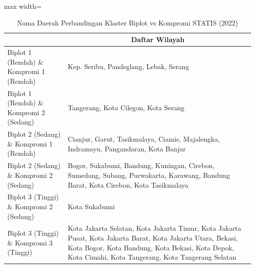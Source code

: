 \begin{table}[H]
\centering
\caption{Nama Daerah Perbandingan Klaster Biplot vs Kompromi STATIS (2022)} \label{tab:app1biplot_comp_name_2022}
\begin{adjustbox}{max width=\textwidth}
\begin{tabular}{|>{\centering\arraybackslash}p{4cm}|p{10cm}|}
\hline
\multicolumn{1}{|c|}{\textbf{Kategori}} & \multicolumn{1}{c|}{\textbf{Daftar Wilayah}} \\
\hline
Biplot 1 (Rendah) \& Kompromi 1 (Rendah) & Kep. Seribu, Pandeglang, Lebak, Serang \\
\hline
Biplot 1 (Rendah) \& Kompromi 2 (Sedang) & Tangerang, Kota Cilegon, Kota Serang \\
\hline
Biplot 2 (Sedang) \& Kompromi 1 (Rendah) & Cianjur, Garut, Tasikmalaya, Ciamis, Majalengka, Indramayu, Pangandaran, Kota Banjar \\
\hline
Biplot 2 (Sedang) \& Kompromi 2 (Sedang) & Bogor, Sukabumi, Bandung, Kuningan, Cirebon, Sumedang, Subang, Purwakarta, Karawang, Bandung Barat, Kota Cirebon, Kota Tasikmalaya \\
\hline
Biplot 3 (Tinggi) \& Kompromi 2 (Sedang) & Kota Sukabumi \\
\hline
Biplot 3 (Tinggi) \& Kompromi 3 (Tinggi) & Kota Jakarta Selatan, Kota Jakarta Timur, Kota Jakarta Pusat, Kota Jakarta Barat, Kota Jakarta Utara, Bekasi, Kota Bogor, Kota Bandung, Kota Bekasi, Kota Depok, Kota Cimahi, Kota Tangerang, Kota Tangerang Selatan \\
\hline
\end{tabular}
\end{adjustbox}
\end{table}
